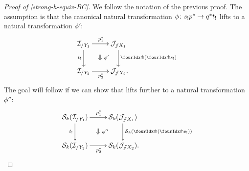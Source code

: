 \documentclass[reqno,10pt,a4paper,oneside,draft]{amsart}
\begin{document}
\begin{proof}[Proof of \cref{strong-h-equiv-BC}]
We follow the notation of the previous proof.
The assumption is that the canonical natural transformation $\phi \colon s_! p^* \to q^* t_!$ lifts to a natural transformation $\phi'$:
\begin{equation*} %
\begin{gathered}
\xymatrix{
  \cal{I}_{/Y_1}
  \ar[r]^{p_1^*}
  \ar[d]_{t_!}
  \ar@{}[dr]|{\textstyle\Downarrow \rlap{$\labelstyle\phi'$}}
&
  \cal{J}_{\fakeslice X_1}
  \ar[d]^{\liftl{(\liftr{s_!})}}
\\
  \cal{I}_{/Y_2}
  \ar[r]_{p_2^*}
&
  \cal{J}_{\fakeslice X_2}
\rlap{.}}
\end{gathered}
\end{equation*}
The goal will follow if we can show that lifts further to a natural transformation $\phi''$:
\begin{equation*} %
\begin{gathered}
\xymatrix{
  \cal{S}_k(\cal{I}_{/Y_1})
  \ar[r]^{p_1^*}
  \ar[d]_{t_!}
  \ar@{}[dr]|{\textstyle\Downarrow \rlap{$\labelstyle\phi''$}}
&
  \cal{S}_k(\cal{J}_{\fakeslice X_1})
  \ar[d]^{\cal{S}_k(\liftl{(\liftr{s_!})})}
\\
  \cal{S}_k(\cal{I}_{/Y_2})
  \ar[r]_{p_2^*}
&
  \cal{S}_k(\cal{J}_{\fakeslice X_2})
\rlap{.}}
\end{gathered}
\end{equation*}


\end{proof}
\end{document}
